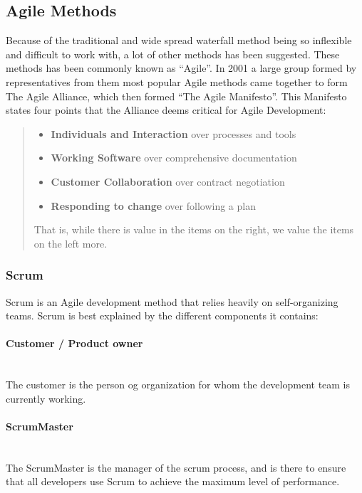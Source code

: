 \subsection{Agile Methods}

Because of the traditional and wide spread waterfall method being so inflexible and difficult to work with, a lot of other methods has been suggested. These methods has been commonly known as ``Agile''. In 2001 a large group formed by representatives from them most popular Agile methods came together to form The Agile Alliance, which then formed ``The Agile Manifesto''. This Manifesto states four points that the Alliance deems critical for Agile Development:

\begin{quotation}
\begin{itemize}
	\item \textbf{Individuals and Interaction} over processes and tools
	\item \textbf{Working Software} over comprehensive documentation
	\item \textbf{Customer Collaboration} over contract negotiation
	\item \textbf{Responding to change} over following a plan
\end{itemize}

That is, while there is value in the items on the right, we value the items on the left more.
\end{quotation}

\subsubsection{Scrum}
Scrum is an Agile development method that relies heavily on self-organizing teams. Scrum is best explained by the different components it contains:

\paragraph{Customer / Product owner}\ \\
The customer is the person og organization for whom the development team is currently working.

\paragraph{ScrumMaster}\ \\
The ScrumMaster is the manager of the scrum process, and is there to ensure that all developers use Scrum to achieve the maximum level of performance.

